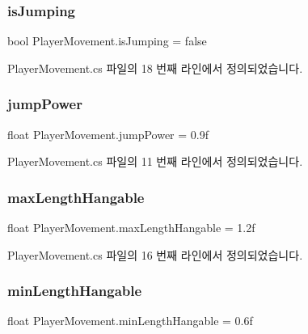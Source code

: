 \subsubsection{\texorpdfstring{isJumping}{isJumping}}
{\footnotesize\ttfamily bool Player\+Movement.\+is\+Jumping = false\hspace{0.3cm}{\ttfamily [private]}}



Player\+Movement.\+cs 파일의 18 번째 라인에서 정의되었습니다.

\mbox{\label{class_player_movement_a7311cb033c65d133e59546388a1ad59d}} 
\subsubsection{\texorpdfstring{jumpPower}{jumpPower}}
{\footnotesize\ttfamily float Player\+Movement.\+jump\+Power = 0.\+9f}



Player\+Movement.\+cs 파일의 11 번째 라인에서 정의되었습니다.

\mbox{\label{class_player_movement_afa2e0ac8637c0da3e1efa8191aac5433}} 
\subsubsection{\texorpdfstring{maxLengthHangable}{maxLengthHangable}}
{\footnotesize\ttfamily float Player\+Movement.\+max\+Length\+Hangable = 1.\+2f}



Player\+Movement.\+cs 파일의 16 번째 라인에서 정의되었습니다.

\mbox{\label{class_player_movement_ad37bd6a04342f85d26aa7c268a0c8c64}} 
\subsubsection{\texorpdfstring{minLengthHangable}{minLengthHangable}}
{\footnotesize\ttfamily float Player\+Movement.\+min\+Length\+Hangable = 0.\+6f}



